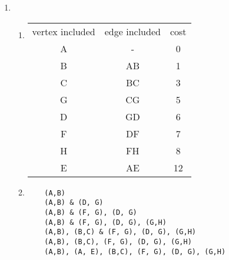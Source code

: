 \documentclass{article}
\begin{document}
\begin{enumerate}
	edge being of weight of at most W. We implement a heap on the distance values by making an array of size W($|V|$ - 1) + 2 indexed by all possible distance values with each index of the array, i, a pointer to
	a linked list of values where distance = i. Thus, insertion operations are constant time since we iterate through the array till the appropriate linked list is found to append the incoming element to. The
	implementation of the heap on distance values makes the time complexity of makeheap $O(|V|)$. When running Dijkstra's algorithm, the heap's min value is repeatedly increasing, which means the deletemin
	operation only looks at each array element once looking for the minimum. This makes the complexity of deletemin $O(W|V|)$. For the decreasekey operation, we insert a new copy of the incoming element into the
	corresponding value linked list without needing to remove previous copies. There are at most $|E|$ decreasekey operation instances, which makes the total complexity of all decreasekey operations $O(|E|)$.
	Summing the three time complexities involved in Dijkstra's algorithm, we find that $O(|V|)$ + $O(W|V|)$ + $O(|E|)$ = $O(W|V| + |E|)$.
	\item \begin{enumerate}
		\item \begin{tabular}{c c c}
		vertex included & edge included & cost \\
		A & - & 0 \\
		B & AB & 1 \\
		C & BC & 3 \\
		G & CG & 5 \\
		D & GD & 6 \\
		F & DF & 7 \\
		H & FH & 8 \\
		E & AE & 12 \\
		\end{tabular}
		\item \begin{lstlisting}
	(A,B)
	(A,B) & (D, G)
	(A,B) & (F, G), (D, G)
	(A,B) & (F, G), (D, G), (G,H)
	(A,B), (B,C) & (F, G), (D, G), (G,H)
	(A,B), (B,C), (F, G), (D, G), (G,H)
	(A,B), (A, E), (B,C), (F, G), (D, G), (G,H)
		\end{lstlisting}
	\end{enumerate}

	\clearpage
\end{enumerate}
\end{document}
